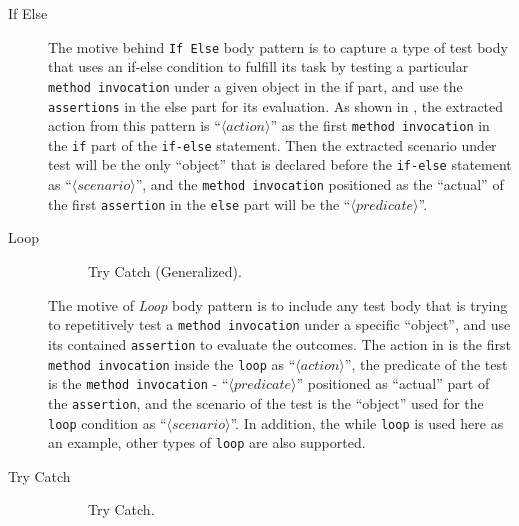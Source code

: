\documentclass[proposal.tex]{subfiles}
\begin{document}
\begin{description}

\item[If Else]


The motive behind \texttt{If Else} body pattern is to capture a type of test body that uses an if-else condition to fulfill its task by testing a particular \texttt{method invocation} under a given object in the if part, and use the \texttt{assertions} in the else part for its evaluation.
%
As shown in , the extracted action from this pattern is \enquote{$\langle action \rangle$} as the first \texttt{method invocation} in the \texttt{if} part of the \texttt{if-else} statement.
%
Then the extracted scenario under test will be the only \enquote{object} that is declared before the \texttt{if-else} statement as \enquote{$\langle scenario \rangle$}, and the \texttt{method invocation} positioned as the \enquote{actual} of the first \texttt{assertion} in the \texttt{else} part will be the \enquote{$\langle predicate \rangle$}.


\item[Loop]

\begin{figure}[!htb]
\centering
    \begin{subfigure}{0.65\textwidth}
    \end{subfigure}
\caption{Try Catch (Generalized).}
\label{tc_any}
\end{figure}

The motive of \textit{Loop} body pattern is to include any test body that is trying to repetitively test a \texttt{method invocation} under a specific \enquote{object}, and use its contained \texttt{assertion} to evaluate the outcomes.
%
The action in  is the first \texttt{method invocation} inside the \texttt{loop} as \enquote{$\langle action \rangle$}, the predicate of the test is the \texttt{method invocation} - \enquote{$\langle predicate \rangle$} positioned as \enquote{actual} part of the \texttt{assertion}, and the scenario of the test is the \enquote{object} used for the \texttt{loop} condition as \enquote{$\langle scenario \rangle$}.
%
In addition, the while \texttt{loop} is used here as an example, other types of \texttt{loop} are also supported.


\item[Try Catch]

\begin{figure}[t]
\centering
    \begin{subfigure}{0.65\textwidth}
    \end{subfigure}
\caption{Try Catch.}
\label{tryCP}
\end{figure}


\end{description}
\end{document}
